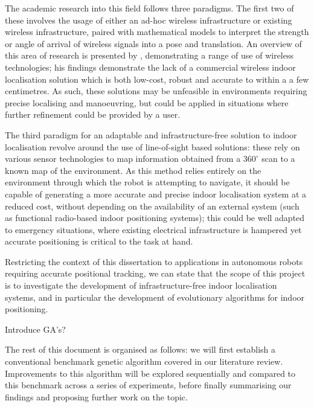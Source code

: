 \documentclass[authoryearcitations]{UoYCSproject}
\begin{document}
The academic research into this field follows three paradigms. The first two of these involves the usage of either an ad-hoc wireless infrastructure or existing wireless infrastructure, paired with mathematical models to interpret the strength or angle of arrival of wireless signals into a pose and translation. An overview of this area of research is presented by \citet{Liu2007-in}, demonstrating a range of use of wireless technologies; his findings demonstrate the lack of a commercial wireless indoor localisation solution which is both low-cost, robust and accurate to within a a few centimetres. As such, these solutions may be unfeasible in environments requiring precise localising and manoeuvring, but could be applied in situations where further refinement could be provided by a user. 
\newline

The third paradigm for an adaptable and infrastructure-free solution to indoor localisation revolve around the use of line-of-sight based solutions: these rely on various sensor technologies to map information obtained from a  $360^{\circ}$ scan to a known map of the environment. As this method relies entirely on the environment through which the robot is attempting to navigate, it should be capable of generating a more accurate and precise indoor localisation system at a reduced cost, without depending on the availability of an external system (such as functional radio-based indoor positioning systems); this could be well adapted to emergency situations, where existing electrical infrastructure is hampered yet accurate positioning is critical to the task at hand. 
\newline

Restricting the context of this dissertation to applications in autonomous robots requiring accurate positional tracking, we can state that the scope of this project is to investigate the development of infrastructure-free indoor localisation systems, and in particular the development of evolutionary algorithms for indoor positioning.
\newline

\color{red}
Introduce GA's?
\color{black}
\newline 

The rest of this document is organised as follows: we will first establish a conventional benchmark genetic algorithm covered in our literature review. Improvements to this algorithm will be explored sequentially and compared to this benchmark across a series of experiments, before finally summarising our findings and proposing further work on the topic.
\end{document}
